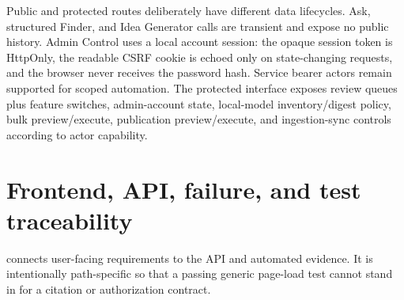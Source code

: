 Public and protected routes deliberately have different data lifecycles. Ask, structured Finder, and Idea Generator calls are transient and expose no public history. Admin Control uses a local account session: the opaque session token is HttpOnly, the readable CSRF cookie is echoed only on state-changing requests, and the browser never receives the password hash. Service bearer actors remain supported for scoped automation. The protected interface exposes review queues plus feature switches, admin-account state, local-model inventory/digest policy, bulk preview/execute, publication preview/execute, and ingestion-sync controls according to actor capability.

\section{Frontend, API, failure, and test traceability}

 connects user-facing requirements to the API and automated evidence. It is intentionally path-specific so that a passing generic page-load test cannot stand in for a citation or authorization contract.

